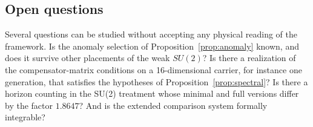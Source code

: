 \subsection{Open questions}

Several questions can be studied without accepting any physical reading of the framework.  Is the anomaly selection of
Proposition~\ref{prop:anomaly} known, and does it survive other placements of the weak \(SU(2)\)?  Is there a realization of the
compensator-matrix conditions on a 16-dimensional carrier, for instance one generation, that satisfies the hypotheses of
Proposition~\ref{prop:spectral}?  Is there a horizon counting in the SU(2) treatment whose minimal and full versions differ by the factor
\(1.8647\)?  And is the extended comparison system formally integrable?
